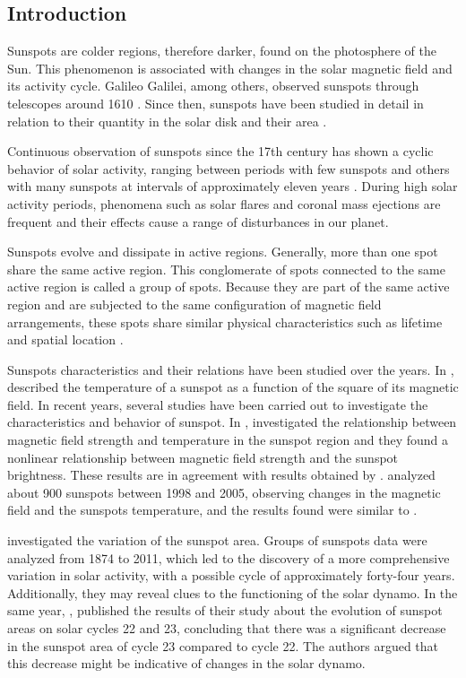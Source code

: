 \documentclass[namedreferences]{solarphysics}
\begin{document}
\begin{article}
\section{Introduction}
     \label{S-Introduction} 
Sunspots are colder regions, therefore darker, found on the photosphere of the Sun.
This phenomenon is associated with changes in the solar magnetic field and its activity cycle.
Galileo Galilei, among others, observed sunspots through telescopes around 1610 \citep{Eddy1976}.
Since then, sunspots have been studied in detail in relation to their quantity in the solar disk and their area \citep{Hathaway2015}.

Continuous observation of sunspots since the 17th century has shown a cyclic behavior of solar activity,
ranging between periods with few sunspots and others with many sunspots at intervals of approximately eleven years \citep{Hathaway2015}.
During high solar activity periods, phenomena such as solar flares and coronal mass ejections are frequent and their effects cause a range of disturbances in our planet.

Sunspots evolve and dissipate in active regions.
Generally, more than one spot share the same active region.
This conglomerate of spots connected to the same active region is called a group of spots.
Because they are part of the same active region and are subjected to the same configuration of magnetic field arrangements,
these spots share similar physical characteristics such as lifetime and spatial location \citep{curto2008}.

Sunspots characteristics and their relations have been studied over the years.
In \citeyear{Dicke1970}, \citeauthor{Dicke1970} described the temperature of a sunspot as a function of the square of its magnetic field.
In recent years, several studies have been carried out to investigate the characteristics and behavior of sunspot.
In \citeyear{Kopp1992}, \citeauthor{Kopp1992} investigated the relationship between magnetic field strength and temperature in the sunspot region and they found a nonlinear relationship between magnetic field strength and the sunspot brightness.
These results are in agreement with results obtained by \citealp{Dicke1970}.
\citealp{Penn2006} analyzed about 900 sunspots between 1998 and 2005,
observing changes in the magnetic field and the sunspots temperature,
and the results found were similar to \citealp{Kopp1992}.

\citealp{Javaraiah2013} investigated the variation of the sunspot area.
Groups of sunspots data were analyzed from 1874 to 2011,
which led to the discovery of a more comprehensive variation in solar activity, 
with a possible cycle of approximately forty-four years.
Additionally, they may reveal clues to the functioning of the solar dynamo. 
In the same year, \citealp{Toma2013}, published the results of their study about the evolution of sunspot areas on solar cycles 22 and 23,
concluding that there was a significant decrease in the sunspot area of cycle 23 compared to cycle 22.
The authors argued that this decrease might be indicative of changes in the solar dynamo.


\end{article}
\end{document}
